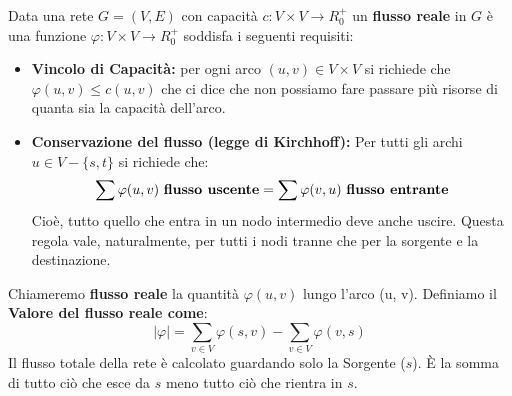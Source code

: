 Data una rete $G=(V,E)$ con capacità $c: V \times V \to R_0^+$ un \textbf{flusso reale} in $G$ è una funzione $\varphi: V \times V \to R_0^+$ soddisfa i seguenti requisiti:
\begin{itemize}
    \item \textbf{Vincolo di Capacità:} per ogni arco $(u,v) \in V\times V$ si richiede che $\varphi(u,v) \leq c(u,v)$ che ci dice che non possiamo fare passare più risorse di quanta sia la capacità dell'arco.
    \item \textbf{Conservazione del flusso (legge di Kirchhoff):} Per tutti gli archi $u\in V - \{s,t\}$ si richiede che:
    \[\sum \varphi(u,v) \text{ \textbf{flusso uscente}} = \sum \varphi(v, u) \text{ \textbf{flusso entrante}}\]
    Cioè, tutto quello che entra in un nodo intermedio deve anche uscire. Questa regola vale, naturalmente, per tutti i nodi tranne che per la sorgente e la destinazione.
\end{itemize}
Chiameremo \textbf{flusso reale} la quantità $\varphi(u,v)$ lungo l'arco (u, v).
Definiamo il \textbf{Valore del flusso reale come}:
\[|\varphi| = \sum_{v \in V} \varphi(s, v) - \sum_{v \in V} \varphi(v, s)\]
Il flusso totale della rete è calcolato guardando solo la Sorgente ($s$).
È la somma di tutto ciò che esce da $s$ meno tutto ciò che rientra in $s$.

